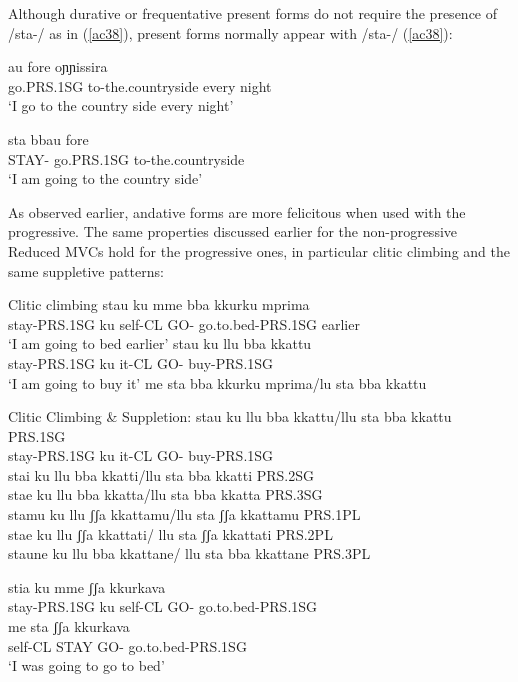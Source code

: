 \documentclass[output=paper]{langscibook}
\begin{document}
Although durative or frequentative present forms do not require the presence of /sta-/ as in (\ref{ac38}), present forms normally appear with /sta-/ (\ref{ac38}):

\ea \label{ac38}\gll  au        fore         oɲɲissira\\
   go.PRS.1SG  to-the.countryside every night\\
 \glt  ‘I go to the country side every night’
\z

\ea \label{ac39}\gll sta    bbau       fore\\
   STAY- go.PRS.1SG  to-the.countryside \\
\glt   ‘I am going to the country side’
\z

As observed earlier, andative forms are more felicitous when used with the progressive. The same properties discussed earlier for the non-progressive Reduced MVCs hold for the progressive ones, in particular clitic climbing and the same suppletive patterns:

\ea \label{ac40}Clitic climbing 
    \ea \label{ac40a}
        \ea \gll stau       ku  mme   bba  kkurku      mprima\\
      stay-PRS.1SG ku self-CL  GO- go.to.bed-PRS.1SG earlier\\
      \glt ‘I am going to bed earlier’
        \ex \gll stau       ku   llu   bba   kkattu\\
      stay-PRS.1SG  ku   it-CL  GO-  buy-PRS.1SG\\
      \glt ‘I am going to buy it’
        \z
    \ex \label{ac40b}me sta bba kkurku mprima/lu sta bba kkattu
    \z
\z

\ea \label{ac41}Clitic Climbing \& Suppletion:
    \ea \label{ac41a}\gll stau    ku     llu   bba  kkattu/llu sta bba kkattu \hfill PRS.1SG\\
    stay-PRS.1SG ku  it-CL  GO-  buy-PRS.1SG\\
    \glt stai ku llu bba kkatti/llu sta bba kkatti  \hfill     PRS.2SG\\
    stae ku llu bba kkatta/llu sta bba kkatta   \hfill    PRS.3SG\\
    stamu ku llu ʃʃa kkattamu/llu sta ʃʃa kkattamu \hfill  PRS.1PL\\
    stae ku llu ʃʃa kkattati/ llu sta ʃʃa kkattati  \hfill    PRS.2PL\\
    staune ku llu bba kkattane/ llu sta bba kkattane \hfill PRS.3PL\\
    \z
\z

\ea \label{ac42}
    \ea \label{ac42a}\gll stia       ku mme   ʃʃa   kkurkava \\
    stay-PRS.1SG ku self-CL  GO- go.to.bed-PRS.1SG\\
    \ex \label{ac42b}\gll me    sta    ʃʃa   kkurkava\\
    self-CL STAY GO- go.to.bed-PRS.1SG\\
    \glt ‘I was going to go to bed’
    \z
\z
\end{document}
